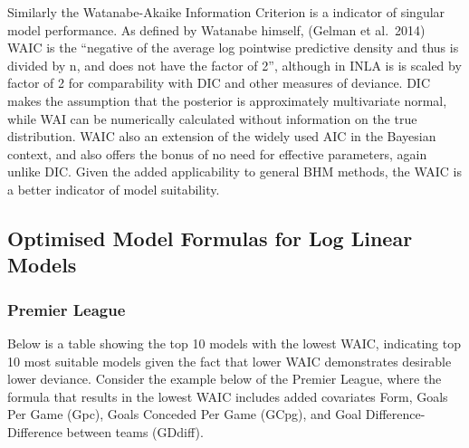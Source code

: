 \documentclass[
]{article}
\begin{document}
Similarly the Watanabe-Akaike Information Criterion is a indicator of
singular model performance. As defined by Watanabe himself, (Gelman et
al.~2014) WAIC is the ``negative of the average log pointwise predictive
density and thus is divided by n, and does not have the factor of 2'',
although in INLA is is scaled by factor of 2 for comparability with DIC
and other measures of deviance. DIC makes the assumption that the
posterior is approximately multivariate normal, while WAI can be
numerically calculated without information on the true distribution.
WAIC also an extension of the widely used AIC in the Bayesian context,
and also offers the bonus of no need for effective parameters, again
unlike DIC. Given the added applicability to general BHM methods, the
WAIC is a better indicator of model suitability.

\hypertarget{optimised-model-formulas-for-log-linear-models}{%
\subsection{Optimised Model Formulas for Log Linear
Models}\label{optimised-model-formulas-for-log-linear-models}}

\hypertarget{premier-league}{%
\subsubsection{Premier League}\label{premier-league}}

Below is a table showing the top 10 models with the lowest WAIC,
indicating top 10 most suitable models given the fact that lower WAIC
demonstrates desirable lower deviance. Consider the example below of the
Premier League, where the formula that results in the lowest WAIC
includes added covariates Form, Goals Per Game (Gpc), Goals Conceded Per
Game (GCpg), and Goal Difference-Difference between teams (GDdiff).
\end{document}
